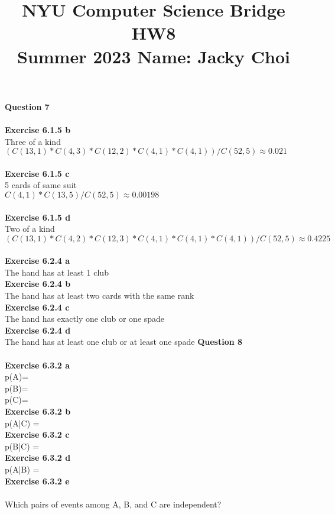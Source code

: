 \documentclass{article}
\title{\textbf{NYU Computer Science Bridge HW8}\\
Summer 2023 Name: Jacky Choi}
\date{}
\begin{document}
\setul{}{2pt}
\maketitle

\noindent \textbf{Question 7}\\\\
\textbf{Exercise 6.1.5 b}\\
Three of a kind\\
$(C(13,1) * C(4,3) * C(12,2) * C(4,1) * C(4,1)) / C(52,5) \approx 0.021$\\\\
\textbf{Exercise 6.1.5 c}\\
5 cards of same suit\\
$C(4,1) * C(13,5) / C(52,5) \approx 0.00198$\\\\
\textbf{Exercise 6.1.5 d}\\
Two of a kind\\
$(C(13,1) * C(4,2) * C(12,3) * C(4,1) * C(4,1) * C(4,1)) / C(52,5) \approx 0.4225$\\\\
\textbf{Exercise 6.2.4 a}\\
The hand has at least 1 club\\
\textbf{Exercise 6.2.4 b}\\
The hand has at least two cards with the same rank\\
\textbf{Exercise 6.2.4 c}\\
The hand has exactly one club or one spade\\
\textbf{Exercise 6.2.4 d}\\
The hand has at least one club or at least one spade
\newpage
\noindent \textbf{Question 8}\\\\
\textbf{Exercise 6.3.2 a}\\
p(A)=\\
p(B)=\\
p(C)=\\
\textbf{Exercise 6.3.2 b}\\
p(A|C) =\\
\textbf{Exercise 6.3.2 c}\\
p(B|C) =\\
\textbf{Exercise 6.3.2 d}\\
p(A|B) =\\
\textbf{Exercise 6.3.2 e}\\\\
Which pairs of events among A, B, and C are independent?\\
\end{document}
